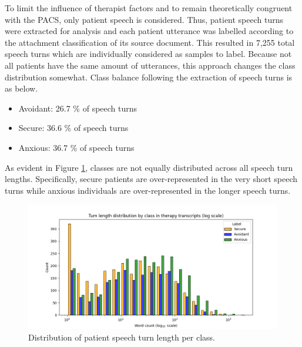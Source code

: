 \documentclass[12pt]{report}
\begin{document}
To limit the influence of therapist factors and to remain theoretically congruent with the PACS, only patient speech is considered.
Thus, patient speech turns were extracted for analysis and each patient utterance was labelled according to the attachment classification of its source document.
This resulted in 7,255 total speech turns which are individually considered as samples to label.
Because not all patients have the same amount of utterances, this approach changes the class distribution somewhat.
Class balance following the extraction of speech turns is as below.
\begin{itemize}
    \item {Avoidant: 26.7 \% of speech turns}
    \item {Secure: 36.6 \% of speech turns}
    \item {Anxious: 36.7 \% of speech turns}
\end{itemize}

As evident in Figure \ref{fig: class balance turn len}, classes are not equally distributed across all speech turn lengths.
Specifically, secure patients are over-represented in the very short speech turns while anxious individuals are over-represented in the longer speech turns.

\begin{figure}
    \includegraphics[width=\textwidth]{figures/log_dodge_turn_length_distribution_by_class.png}
    \caption{Distribution of patient speech turn length per class.}
    \label{fig: class balance turn len}
\end{figure}
\end{document}

